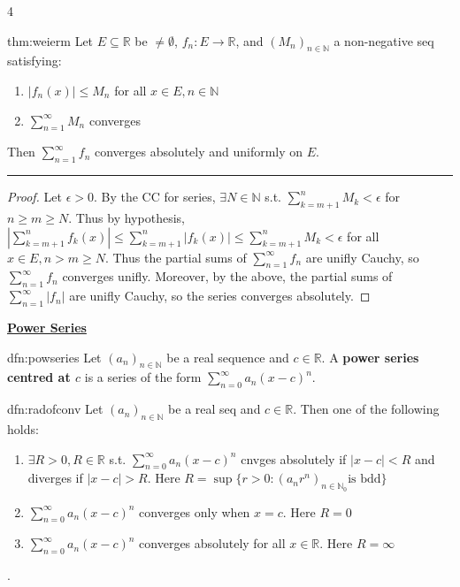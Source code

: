 \documentclass[landscape, 8pt]{extarticle}
\begin{document}
\begin{multicols*}{4}
		
		\begin{thm}{thm:weierm}{ }
		Let $E \subseteq \mathbb{R}$ be $\ne \emptyset$, $f_n: E \to \mathbb{R}$, and $(M_n)_{n\in \mathbb{N}}$ a non-negative seq satisfying:
		\begin{enumerate}[label=(\arabic*)]
			\item $\left|f_n(x)\right| \le M_n$ for all $x\in E, n\in \mathbb{N}$
			\vspace{1pt}
			\item $\sum_{n=1}^{\infty}M_n$ converges
		\end{enumerate}
		Then $\sum_{n=1}^{\infty}f_n$ converges absolutely and uniformly on $E$.
		\vspace{1pt}
		\hrule	
		\vspace{-6pt}
		\begin{proof}
			Let $\epsilon > 0$. By the CC for series, $\exists N\in \mathbb{N}$ s.t. $\sum_{k=m+1}^{n} M_k <\epsilon$ for $n \ge m \ge N$. Thus by hypothesis, $\left|\sum_{k=m+1}^{n} f_k(x)\right| \le \sum_{k=m+1}^{n}\left|f_k(x)\right| \le \sum_{k=m+1}^{n}M_k <\epsilon$ for all $x\in E, n > m \ge N$. Thus the partial sums of $\sum_{n=1}^{\infty}f_n$ are unifly Cauchy, so $\sum_{n=1}^{\infty}f_n$ converges unifly. Moreover, by the above, the partial sums of $\sum_{n=1}^{\infty}\left|f_n\right|$ are unifly Cauchy, so the series converges absolutely.
		\end{proof}
		
		\end{thm}
		
		
		
		{\tiny \textbf{\underline{Power Series}}}
		
		
		
		\begin{dfn}{dfn:powseries}{ }
			Let $(a_n)_{n\in \mathbb{N}}$ be a real sequence and $c\in \mathbb{R}$. A \textbf{power series centred at $c$} is a series of the form $\sum_{n=0}^{\infty}a_n(x-c)^n$.
		
		\end{dfn}
		
		
		\begin{dfn}{dfn:radofconv}{ }
			Let $(a_n)_{n\in \mathbb{N}}$ be a real seq and $c\in \mathbb{R}$. Then one of the following holds:
			\begin{enumerate}[label=(\arabic*)]
				\item $\exists R > 0, R\in \mathbb{R}$ s.t. $\sum_{n=0}^{\infty}a_n(x-c)^n$ cnvges absolutely if $\left|x - c\right| < R$ and diverges if $\left|x-c\right|> R$. Here $R = \sup\{r > 0 : (a_nr^n)_{n\in \mathbb{N}_0} \text{is bdd}\}$
				\item $\sum_{n=0}^{\infty}a_n(x-c)^n$ converges only when $x = c$. Here $R = 0$
				\item $\sum_{n=0}^{\infty}a_n(x-c)^n$ converges absolutely for all $x\in \mathbb{R}$. Here $R = \infty$
			\end{enumerate}.
		

\end{dfn}
\end{multicols*}
\end{document}
